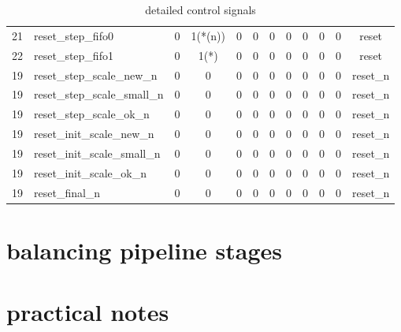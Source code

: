 \documentclass[mscthesis]{usiinfthesis}
\begin{document}
\begin{table}
\begin{center}
\begin{tabular}{|c|l|*{10}{c|}}
    21   & reset\_step\_fifo0          & 0    & 1(*(n))& 0    & 0          & 0      & 0      & 0    & 0    & 0     & reset       \\
    22   & reset\_step\_fifo1          & 0    & 1(*)   & 0    & 0          & 0      & 0      & 0    & 0    & 0     & reset       \\
    19   & reset\_step\_scale\_new\_n  & 0    & 0      & 0    & 0          & 0      & 0      & 0    & 0    & 0     & reset\_n    \\
    19   & reset\_step\_scale\_small\_n& 0    & 0      & 0    & 0          & 0      & 0      & 0    & 0    & 0     & reset\_n    \\
    19   & reset\_step\_scale\_ok\_n   & 0    & 0      & 0    & 0          & 0      & 0      & 0    & 0    & 0     & reset\_n    \\
    19   & reset\_init\_scale\_new\_n  & 0    & 0      & 0    & 0          & 0      & 0      & 0    & 0    & 0     & reset\_n    \\
    19   & reset\_init\_scale\_small\_n& 0    & 0      & 0    & 0          & 0      & 0      & 0    & 0    & 0     & reset\_n    \\
    19   & reset\_init\_scale\_ok\_n   & 0    & 0      & 0    & 0          & 0      & 0      & 0    & 0    & 0     & reset\_n    \\
    19   & reset\_final\_n             & 0    & 0      & 0    & 0          & 0      & 0      & 0    & 0    & 0     & reset\_n    \\
    \hline
    \end{tabular}
    \end{center}
    \caption{detailed control signals}
    \label{tab:ctrl_detailed}
\end{table}

\section{balancing pipeline stages}

\section{practical notes}
\end{document}
